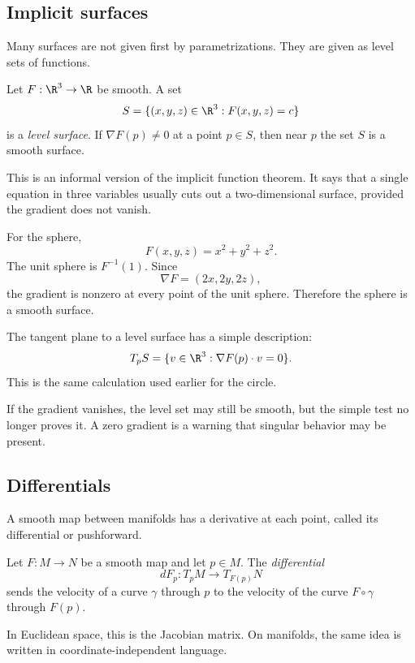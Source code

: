 \subsection{Implicit surfaces}

Many surfaces are not given first by parametrizations. They are given as level
sets of functions.

\begin{definition}
Let $F:\R^3\to\R$ be smooth. A set
\[
S=\{(x,y,z)\in\R^3:F(x,y,z)=c\}
\]
is a \emph{level surface}. If $\nabla F(p)\neq 0$ at a point $p\in S$, then
near $p$ the set $S$ is a smooth surface.
\end{definition}

This is an informal version of the implicit function theorem. It says that a
single equation in three variables usually cuts out a two-dimensional surface,
provided the gradient does not vanish.

\begin{example}
For the sphere,
\[
F(x,y,z)=x^2+y^2+z^2.
\]
The unit sphere is $F^{-1}(1)$. Since
\[
\nabla F=(2x,2y,2z),
\]
the gradient is nonzero at every point of the unit sphere. Therefore the sphere
is a smooth surface.
\end{example}

The tangent plane to a level surface has a simple description:
\[
T_pS=\{v\in\R^3:\nabla F(p)\cdot v=0\}.
\]
This is the same calculation used earlier for the circle.

\begin{trapbox}
If the gradient vanishes, the level set may still be smooth, but the simple
test no longer proves it. A zero gradient is a warning that singular behavior
may be present.
\end{trapbox}

\subsection{Differentials}

A smooth map between manifolds has a derivative at each point, called its
differential or pushforward.

\begin{definition}
Let $F:M\to N$ be a smooth map and let $p\in M$. The \emph{differential}
\[
dF_p:T_pM\to T_{F(p)}N
\]
sends the velocity of a curve $\gamma$ through $p$ to the velocity of the curve
$F\circ\gamma$ through $F(p)$.
\end{definition}

In Euclidean space, this is the Jacobian matrix. On manifolds, the same idea is
written in coordinate-independent language.


